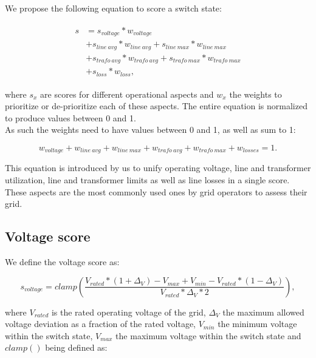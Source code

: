 We propose the following equation to score a switch state:

\begin{align}
    \begin{split}
        s &= s_{voltage} * w_{voltage}\\
        & + s_{line \ avg} * w_{line \ avg} + s_{line \ max} * w_{line \ max}\\
        & + s_{trafo \ avg} * w_{trafo \ avg} + s_{trafo \ max} * w_{trafo \ max}\\
        & + s_{loss} * w_{loss},
    \end{split}
    \label{eq:score}
\end{align}

where $s_x$ are scores for different operational aspects
and $w_x$ the weights to prioritize or de-prioritize each of these
aspects. The entire equation is normalized to produce values between 0 and 1.\\
As such the weights need to have values between 0 and 1, as well as sum to 1:

\begin{equation}
    w_{voltage} + w_{line \ avg} + w_{line \ max} + w_{trafo \ avg} + w_{trafo \ max} + w_{losses} = 1.
\end{equation}

This equation is introduced by us to unify operating voltage,
line and transformer utilization,
line and transformer limits as well as line losses in a
single score. These 
aspects are the most commonly used ones by grid operators to assess their
grid\autocite{venios}.

\subsection{Voltage score}

We define the voltage score as:

\begin{equation}
    s_{voltage} = clamp(\frac{V_{rated}*(1+\Delta_{V}) - V_{max}
                +       V_{min} - V_{rated}*(1-\Delta_{V})}
                {{V_{rated}*\Delta_{V}}*2}),
                \label{eq:score:voltage}
\end{equation}

where $V_{rated}$ is the rated operating voltage of the grid, $\Delta_V$ the maximum allowed
voltage deviation as a fraction of the rated voltage, $V_{min}$ the minimum voltage  within
the switch state, $V_{max}$ the maximum voltage within the switch state and $clamp()$ being
defined as:

